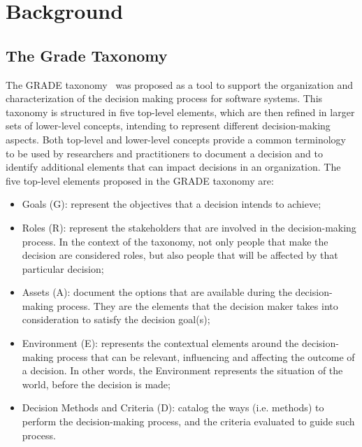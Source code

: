 \section{Background}
\label{sec-background}


\subsection{The Grade Taxonomy}
\label{subsec-taxonomy}

The GRADE taxonomy~\cite{papatheocharous2015decision,papatheocharous2018thegrade} was proposed as a tool to support the organization and characterization of the decision making process for software systems. This taxonomy is structured in five top-level elements, which are then refined in larger sets of lower-level concepts, intending to represent different decision-making aspects. Both top-level and lower-level concepts provide a common terminology to be used by researchers and practitioners to document a decision and to identify additional elements that can impact decisions in an organization. The five top-level elements proposed in the GRADE taxonomy are: 
\begin{itemize}
	\item Goals (G): represent the objectives that a decision intends to achieve;
	\item Roles (R): represent the stakeholders that are involved in the decision-making process. In the context of the taxonomy, not only people that make the decision are considered roles, but also people that will be affected by that particular decision;
	\item Assets (A): document the options that are available during the decision-making process. They are the elements that the decision maker takes into consideration to satisfy the decision goal(s);
	\item Environment (E): represents the contextual elements around the decision-making process that can be relevant, influencing and affecting the outcome of a decision. In other words, the Environment represents the situation of the world, before the decision is made;
	\item  Decision Methods and Criteria (D): catalog the ways (i.e. methods) to perform the decision-making process, and the criteria evaluated to guide such process.
\end{itemize}   

%


